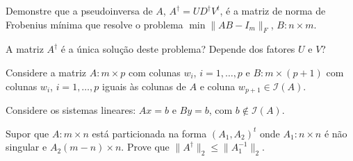 \documentclass[a4paper,12pt, leqno, answers]{exam}
\begin{document}
\begin{questions}
    \question Demonstre que a pseudoinversa de $A$, $A^\dagger = U D^\dagger V^t$, \'{e} a matriz de norma de Frobenius m\'{i}nima que resolve o problema $\min \| A B - I_m \|_F$, $B : n \times m$.

    A matriz $A^\dagger$ \'{e} a \'{u}nica solu\c{c}\~{a}o deste problema? Depende dos fatores $U$ e $V$?

    \begin{solution}
    \end{solution}

    \question Considere a matriz $A : m \times p$ com colunas $w_i$, $i = 1, \ldots, p$ e $B : m \times (p + 1)$ com colunas $w_i$, $i = 1, \ldots, p$ iguais \`{a}s colunas de $A$ e coluna $w_{p + 1} \in \mathcal{I}(A)$.

    Considere os sistemas lineares: $A x = b$ e $B y = b$, com $b \not\in \mathcal{I}(A)$.

    \question Supor que $A : m \times n$ est\'{a} particionada na forma $(A_1 , A_2)^t$ onde $A_1 : n \times n$ \'{e} n\~{a}o singular e $A_2 (m - n) \times n$. Prove que $\| A^\dagger \|_2 \leq \| A_1^{-1} \|_2$.
    \begin{solution}
    \end{solution}
\end{questions}
% 
% 
\end{document}
